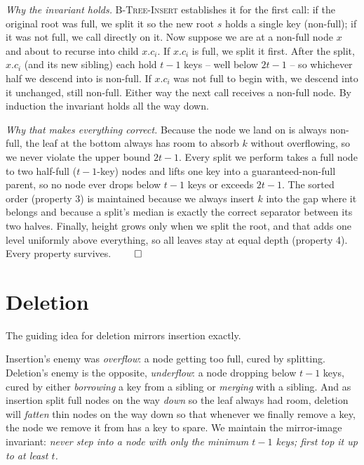 \emph{Why the invariant holds.} \textsc{B-Tree-Insert} establishes it for the
first call: if the original root was full, we split it so the new root $s$ holds a
single key (non-full); if it was not full, we call directly on it. Now suppose we
are at a non-full node $x$ and about to recurse into child $x.c_i$. If $x.c_i$ is
full, we split it first. After the split, $x.c_i$ (and its new sibling) each hold
$t-1$ keys -- well below $2t-1$ -- so whichever half we descend into is non-full.
If $x.c_i$ was not full to begin with, we descend into it unchanged, still
non-full. Either way the next call receives a non-full node. By induction the
invariant holds all the way down.

\emph{Why that makes everything correct.} Because the node we land on is always
non-full, the leaf at the bottom always has room to absorb $k$ without overflowing,
so we never violate the upper bound $2t-1$. Every split we perform takes a full
node to two half-full ($t-1$-key) nodes and lifts one key into a guaranteed-non-full
parent, so no node ever drops below $t-1$ keys or exceeds $2t-1$. The sorted order
(property 3) is maintained because we always insert $k$ into the gap where it
belongs and because a split's median is exactly the correct separator between its
two halves. Finally, height grows only when we split the root, and that adds one
level uniformly above everything, so all leaves stay at equal depth (property 4).
Every property survives. $\qed$

\section{Deletion}

The guiding idea for deletion mirrors insertion exactly.

\begin{intuitionbox}
Insertion's enemy was \emph{overflow}: a node getting too full, cured by splitting.
Deletion's enemy is the opposite, \emph{underflow}: a node dropping below $t-1$
keys, cured by either \emph{borrowing} a key from a sibling or \emph{merging} with a
sibling. And as insertion split full nodes on the way \emph{down} so the leaf
always had room, deletion will \emph{fatten} thin nodes on the way down so that
whenever we finally remove a key, the node we remove it from has a key to spare. We
maintain the mirror-image invariant: \emph{never step into a node with only the
minimum $t-1$ keys; first top it up to at least $t$.}
\end{intuitionbox}

